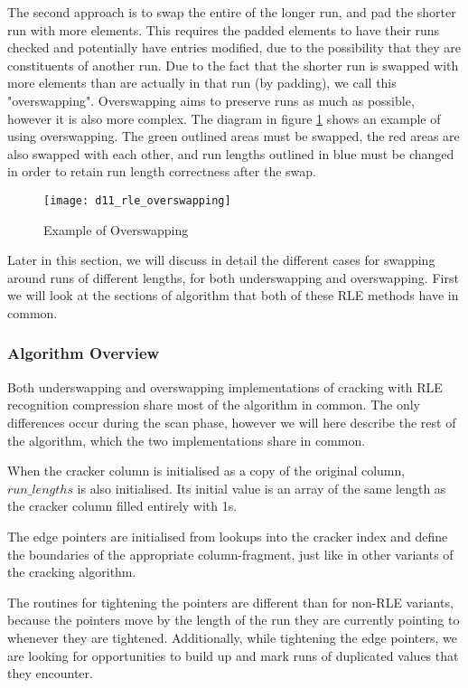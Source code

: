 The second approach is to swap the entire of the longer run, and pad the shorter run with more elements. This requires the padded elements to have their runs checked and potentially have entries modified, due to the possibility that they are constituents of another run. Due to the fact that the shorter run is swapped with more elements than are actually in that run (by padding), we call this "overswapping". Overswapping aims to preserve runs as much as possible, however it is also more complex. The diagram in figure \ref{fig:rle_overswapping} shows an example of using overswapping. The green outlined areas must be swapped, the red areas are also swapped with each other, and run lengths outlined in blue must be changed in order to retain run length correctness after the swap.

\begin{figure}[H]
  \centering
  \texttt{[image: d11\_rle\_overswapping]}
  \caption{Example of Overswapping}
  \label{fig:rle_overswapping}
\end{figure}

Later in this section, we will discuss in detail the different cases for swapping around runs of different lengths, for both underswapping and overswapping. First we will look at the sections of algorithm that both of these RLE methods have in common.

\subsubsection{Algorithm Overview}

Both underswapping and overswapping implementations of cracking with RLE recognition compression share most of the algorithm in common. The only differences occur during the scan phase, however we will here describe the rest of the algorithm, which the two implementations share in common.

When the cracker column is initialised as a copy of the original column, $run\_lengths$ is also initialised. Its initial value is an array of the same length as the cracker column filled entirely with 1s.

The edge pointers are initialised from lookups into the cracker index and define the boundaries of the appropriate column-fragment, just like in other variants of the cracking algorithm.

The routines for tightening the pointers are different than for non-RLE variants, because the pointers move by the length of the run they are currently pointing to whenever they are tightened. Additionally, while tightening the edge pointers, we are looking for opportunities to build up and mark runs of duplicated values that they encounter.

